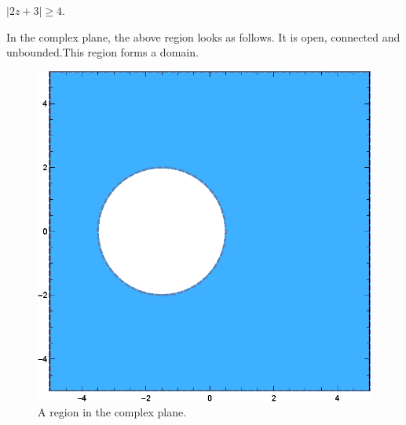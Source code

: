 \documentclass[12pt]{book}
\begin{document}
\begin{exmp}
    $|2z + 3| \geq 4.$
\end{exmp}
In the complex plane, the above region looks as follows. It is open, connected and unbounded.This region forms a domain.
\begin{figure}[H]
    \centering
    \includegraphics[scale = 0.7]{./figs/chapter_1/region_plot_2.eps}
    \caption{A region in the complex plane.}
\end{figure}
\end{document}

